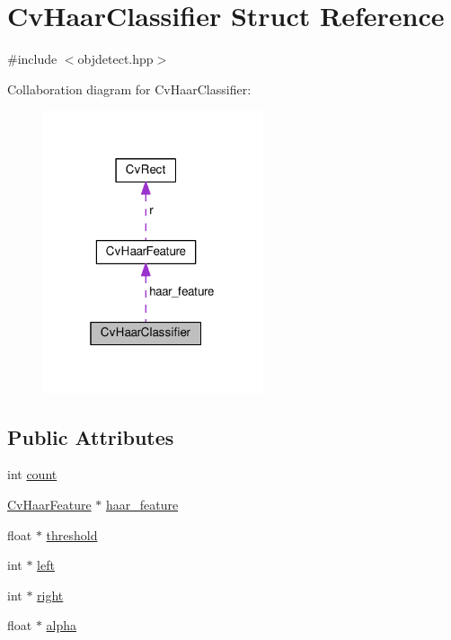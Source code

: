 \hypertarget{structCvHaarClassifier}{\section{Cv\-Haar\-Classifier Struct Reference}
\label{structCvHaarClassifier}
}


{\ttfamily \#include $<$objdetect.\-hpp$>$}



Collaboration diagram for Cv\-Haar\-Classifier\-:\nopagebreak
\begin{figure}[H]
\begin{center}
\leavevmode
\includegraphics[width=184pt]{structCvHaarClassifier__coll__graph}
\end{center}
\end{figure}
\subsection*{Public Attributes}
\begin{DoxyCompactItemize}
\item 
int \hyperlink{structCvHaarClassifier_a3ba787f11eefe63769d5a0022637ce4e}{count}
\item 
\hyperlink{structCvHaarFeature}{Cv\-Haar\-Feature} $\ast$ \hyperlink{structCvHaarClassifier_af725c589aa9dca1f885e7325344c5e2a}{haar\-\_\-feature}
\item 
float $\ast$ \hyperlink{structCvHaarClassifier_ace474e46e89bd798e5b6876a0e7e7b49}{threshold}
\item 
int $\ast$ \hyperlink{structCvHaarClassifier_a18f94870d89d594a11331a7a1c87a9f5}{left}
\item 
int $\ast$ \hyperlink{structCvHaarClassifier_a66d9f903380ac8e6fd69dfcfde987b76}{right}
\item 
float $\ast$ \hyperlink{structCvHaarClassifier_a88adaa53db275db0896d27a3950d8923}{alpha}
\end{DoxyCompactItemize}


